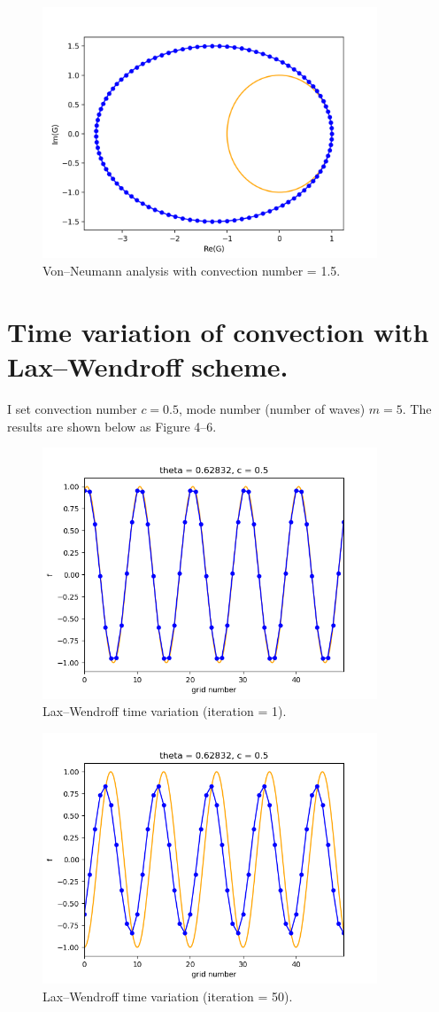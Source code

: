 \documentclass[a4paper,11pt]{article}
\begin{document}
\begin{figure}[H]
	\centering
	\includegraphics[width=10cm]{fig/vn15.png}
	\caption{Von–Neumann analysis with convection number = 1.5.} 
\end{figure}

\section{Time variation of convection with Lax–Wendroff scheme.}
I set convection number $c = 0.5$, mode number (number of waves) $m = 5$.
The results are shown below as Figure 4–6.

\begin{figure}[H]
	\centering
	\includegraphics[width=10cm]{fig/lax_wen001}
	\caption{Lax–Wendroff time variation (iteration = 1).} 
\end{figure}


\begin{figure}[H]
	\centering
	\includegraphics[width=10cm]{fig/lax_wen050}
	\caption{Lax–Wendroff time variation (iteration = 50).} 
\end{figure}
\end{document}
